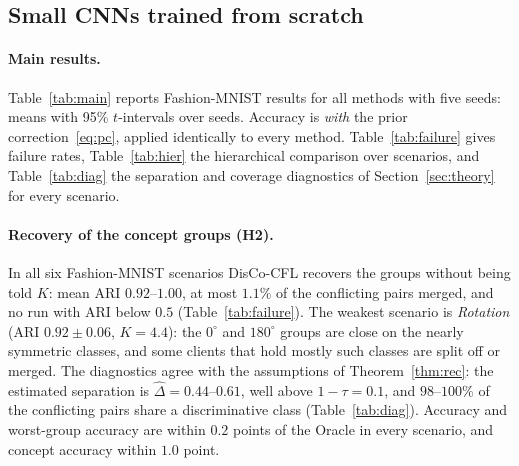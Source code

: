 \subsection{Small CNNs trained from scratch}\label{sec:small}
\paragraph{Main results.}
Table~\ref{tab:main} reports Fashion-MNIST results for all methods with five seeds: means with 95\% $t$-intervals over seeds. Accuracy is \emph{with} the prior correction~\eqref{eq:pc}, applied identically to every method. Table~\ref{tab:failure} gives failure rates, Table~\ref{tab:hier} the hierarchical comparison over scenarios, and Table~\ref{tab:diag} the separation and coverage diagnostics of Section~\ref{sec:theory} for every scenario.

\begin{table}[!htbp]
\centering
\caption{Fashion-MNIST, 40 clients, 5 seeds: mean $\pm$ half-width of the 95\% $t$-interval over seeds. $n$: number of seeds. Acc: mean local accuracy with prior correction. Concept: accuracy on the class-balanced test set of the client's concept. Worst-grp: accuracy of the worst concept group. Conflict: fraction of conflicting client pairs placed in one cluster (merge and attachment stages combined). IFCA, FeSEM, FL+HC, PACFL and FedDAG-C receive the true $K$ (in \emph{Label skew only}, $K=1$); DisCo-CFL, MTCFL, StoCFL and FedCCFA find it. For FedCCFA, ARI and $K$ refer to the client partition induced by its per-class clusters.}\label{tab:main}

\end{table}

\begin{table}[!htbp]
\centering
\caption*{Table~\ref{tab:main} (continued).}

\end{table}

\paragraph{Recovery of the concept groups (H2).} In all six Fashion-MNIST scenarios DisCo-CFL recovers the groups without being told $K$: mean ARI $0.92$--$1.00$, at most $1.1\%$ of the conflicting pairs merged, and no run with ARI below $0.5$ (Table~\ref{tab:failure}). The weakest scenario is \emph{Rotation} (ARI $0.92\pm0.06$, $K=4.4$): the $0^\circ$ and $180^\circ$ groups are close on the nearly symmetric classes, and some clients that hold mostly such classes are split off or merged. The diagnostics agree with the assumptions of Theorem~\ref{thm:rec}: the estimated separation is $\hat\Delta=0.44$--$0.61$, well above $1-\tau=0.1$, and $98$--$100\%$ of the conflicting pairs share a discriminative class (Table~\ref{tab:diag}). Accuracy and worst-group accuracy are within $0.2$ points of the Oracle in every scenario, and concept accuracy within $1.0$ point.

